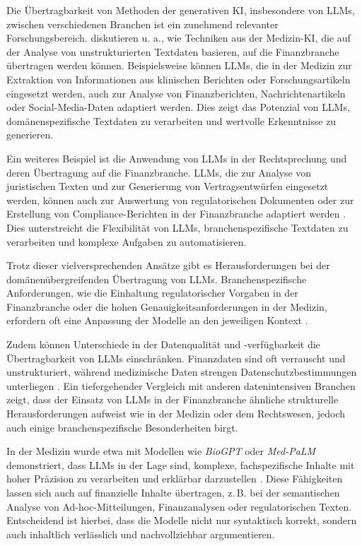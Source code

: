   Die Übertragbarkeit von Methoden der generativen \acs{KI}, insbesondere von \acs{LLM}s, zwischen verschiedenen Branchen ist ein zunehmend relevanter Forschungsbereich.
  \textcite{hecker2017} diskutieren u. a., wie Techniken aus der Medizin-\acs{KI}, die auf der Analyse von unstrukturierten Textdaten basieren, auf die Finanzbranche übertragen werden können.
  Beispielsweise können \acs{LLM}s, die in der Medizin zur Extraktion von Informationen aus klinischen Berichten oder Forschungsartikeln eingesetzt werden, auch zur Analyse von Finanzberichten, Nachrichtenartikeln oder Social-Media-Daten adaptiert werden.
  Dies zeigt das Potenzial von \acs{LLM}s, domänenspezifische Textdaten zu verarbeiten und wertvolle Erkenntnisse zu generieren.

  Ein weiteres Beispiel ist die Anwendung von \acs{LLM}s in der Rechtsprechung und deren Übertragung auf die Finanzbranche.
  \acs{LLM}s, die zur Analyse von juristischen Texten und zur Generierung von Vertragsentwürfen eingesetzt werden, können auch zur Auswertung von regulatorischen Dokumenten oder zur Erstellung von Compliance-Berichten in der Finanzbranche adaptiert werden \autocite{savelka2023explaining}.
  Dies unterstreicht die Flexibilität von \acs{LLM}s, branchenspezifische Textdaten zu verarbeiten und komplexe Aufgaben zu automatisieren.

  Trotz dieser vielversprechenden Ansätze gibt es Herausforderungen bei der domänenübergreifenden Übertragung von \acs{LLM}s.
  Branchenspezifische Anforderungen, wie die Einhaltung regulatorischer Vorgaben in der Finanzbranche oder die hohen Genauigkeitsanforderungen in der Medizin, erfordern oft eine Anpassung der Modelle an den jeweiligen Kontext \autocite{bendavid2021explainable}.

  Zudem können Unterschiede in der Datenqualität und -verfügbarkeit die Übertragbarkeit von \acs{LLM}s einschränken.
  Finanzdaten sind oft verrauscht und unstrukturiert, während medizinische Daten strengen Datenschutzbestimmungen unterliegen \autocite{demiguel2009}.
  Ein tiefergehender Vergleich mit anderen datenintensiven Branchen zeigt, dass der Einsatz von \acs{LLM}s in der Finanzbranche ähnliche strukturelle Herausforderungen aufweist wie in der Medizin oder dem Rechtswesen, jedoch auch einige branchenspezifische Besonderheiten birgt.

  In der Medizin wurde etwa mit Modellen wie \textit{BioGPT} oder \textit{Med-PaLM} demonstriert, dass \acs{LLM}s in der Lage sind, komplexe, fachspezifische Inhalte mit hoher Präzision zu verarbeiten und erklärbar darzustellen \autocite{singhal2022large,luo2022biogpt}.
  Diese Fähigkeiten lassen sich auch auf finanzielle Inhalte übertragen, z.\,B. bei der semantischen Analyse von Ad-hoc-Mitteilungen, Finanzanalysen oder regulatorischen Texten.
  Entscheidend ist hierbei, dass die Modelle nicht nur syntaktisch korrekt, sondern auch inhaltlich verlässlich und nachvollziehbar argumentieren.

